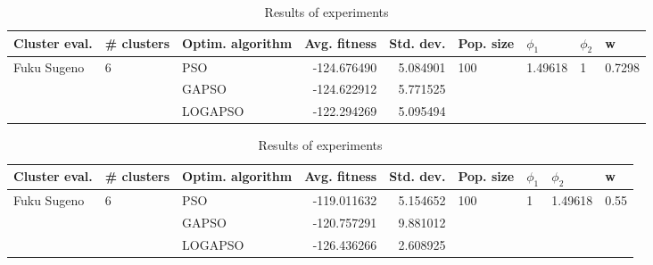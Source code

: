 \documentclass{article}
\begin{document}
\begin{table}
\centering
\caption{Results of experiments}
\begin{tabular}{lllrrllll}
\toprule
               Cluster eval. &        \# clusters & Optim. algorithm &  Avg. fitness &  Std. dev. &            Pop. size &               $\phi_{1}$ &         $\phi_{2}$ &                       w \\
\midrule
\multirow{3}{*}{Fuku Sugeno} & \multirow{3}{*}{6} &              PSO &   -124.676490 &   5.084901 & \multirow{3}{*}{100} & \multirow{3}{*}{1.49618} & \multirow{3}{*}{1} & \multirow{3}{*}{0.7298} \\
                             &                    &            GAPSO &   -124.622912 &   5.771525 &                      &                          &                    &                         \\
                             &                    &          LOGAPSO &   -122.294269 &   5.095494 &                      &                          &                    &                         \\
\bottomrule
\end{tabular}
\end{table}
\begin{table}
\centering
\caption{Results of experiments}
\begin{tabular}{lllrrllll}
\toprule
               Cluster eval. &        \# clusters & Optim. algorithm &  Avg. fitness &  Std. dev. &            Pop. size &         $\phi_{1}$ &               $\phi_{2}$ &                     w \\
\midrule
\multirow{3}{*}{Fuku Sugeno} & \multirow{3}{*}{6} &              PSO &   -119.011632 &   5.154652 & \multirow{3}{*}{100} & \multirow{3}{*}{1} & \multirow{3}{*}{1.49618} & \multirow{3}{*}{0.55} \\
                             &                    &            GAPSO &   -120.757291 &   9.881012 &                      &                    &                          &                       \\
                             &                    &          LOGAPSO &   -126.436266 &   2.608925 &                      &                    &                          &                       \\
\bottomrule
\end{tabular}
\end{table}
\end{document}
